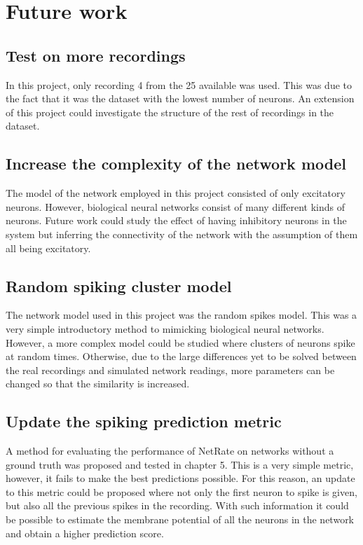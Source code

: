 \section{Future work}

\subsection{Test on more recordings}

In this project, only recording 4 from the 25 available was used. This was due to the fact that it was the dataset with the lowest number of neurons. An extension of this project could investigate the structure of the rest of recordings in the dataset. 

\subsection{Increase the complexity of the network model}

The model of the network employed in this project consisted of only excitatory neurons. However, biological neural networks consist of many different kinds of neurons. Future work could study the effect of having inhibitory neurons in the system but inferring the connectivity of the network with the assumption of them all being excitatory. 

\subsection{Random spiking cluster model}

The network model used in this project was the random spikes model. This was a very simple introductory method to mimicking biological neural networks. However, a more complex model could be studied where clusters of neurons spike at random times. Otherwise, due to the large differences yet to be solved between the real recordings and simulated network readings, more parameters can be changed so that the similarity is increased.

\subsection{Update the spiking prediction metric}

A method for evaluating the performance of NetRate on networks without a ground truth was proposed and tested in chapter 5. This is a very simple metric, however, it fails to make the best predictions possible. For this reason, an update to this metric could be proposed where not only the first neuron to spike is given, but also all the previous spikes in the recording. With such information it could be possible to estimate the membrane potential of all the neurons in the network and obtain a higher prediction score.

